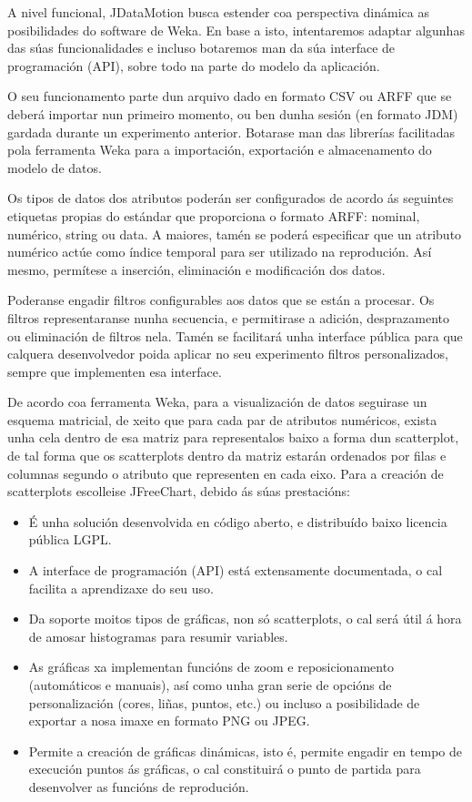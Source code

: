 A nivel funcional, JDataMotion busca estender coa perspectiva dinámica as posibilidades do software de Weka\cite{weka}. En base a isto, intentaremos adaptar algunhas das súas funcionalidades e incluso botaremos man da súa interface de programación (API), sobre todo na parte do modelo da aplicación.
 
O seu funcionamento parte dun arquivo dado en formato CSV ou ARFF que se deberá importar nun primeiro momento, ou ben dunha sesión (en formato JDM) gardada durante un experimento anterior. Botarase man das librerías facilitadas pola ferramenta Weka\cite{weka} para a importación, exportación e almacenamento do modelo de datos. 

Os tipos de datos dos atributos poderán ser configurados de acordo ás seguintes etiquetas propias do estándar que proporciona o formato ARFF\cite{arff}: nominal, numérico, string ou data. A maiores, tamén se poderá especificar que un atributo numérico actúe como índice temporal para ser utilizado na reprodución. Así mesmo, permítese a inserción, eliminación e modificación dos datos.

Poderanse engadir filtros configurables aos datos que se están a procesar. Os filtros representaranse nunha secuencia, e permitirase a adición, desprazamento ou eliminación de filtros nela. Tamén se facilitará unha interface pública para que calquera desenvolvedor poida aplicar no seu experimento filtros personalizados, sempre que implementen esa interface.

De acordo coa ferramenta Weka\cite{weka}, para a visualización de datos seguirase un esquema matricial, de xeito que para cada par de atributos numéricos, exista unha cela dentro de esa matriz para representalos baixo a forma dun scatterplot, de tal forma que os scatterplots dentro da matriz estarán ordenados por filas e columnas segundo o atributo que representen en cada eixo. Para a creación de scatterplots escolleise JFreeChart\cite{jfreechart}, debido ás súas prestacións\cite{jfreechart}\cite{introduction_to_jfreechart}:

\begin{itemize}
\item É unha solución desenvolvida en código aberto, e distribuído baixo licencia pública LGPL.
\item A interface de programación (API) está extensamente documentada, o cal facilita a aprendizaxe do seu uso.
\item Da soporte moitos tipos de gráficas, non só scatterplots, o cal será útil á hora de amosar histogramas para resumir variables.
\item As gráficas xa implementan funcións de zoom e reposicionamento (automáticos e manuais), así como unha gran serie de opcións de personalización (cores, liñas, puntos, etc.) ou incluso a posibilidade de exportar a nosa imaxe en formato PNG ou JPEG.
\item Permite a creación de gráficas dinámicas, isto é, permite engadir en tempo de execución puntos ás gráficas, o cal constituirá o punto de partida para desenvolver as funcións de reprodución.
\end{itemize} 
 
